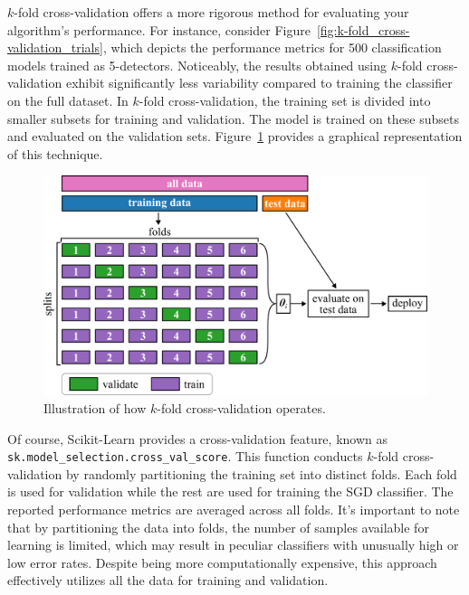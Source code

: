 \documentclass[12pt,letter]{article}
\begin{document}
$k$-fold cross-validation offers a more rigorous method for evaluating your algorithm's performance. For instance, consider Figure~\ref{fig:k-fold_cross-validation_trials}, which depicts the performance metrics for 500 classification models trained as 5-detectors. Noticeably, the results obtained using $k$-fold cross-validation exhibit significantly less variability compared to training the classifier on the full dataset. In $k$-fold cross-validation, the training set is divided into smaller subsets for training and validation. The model is trained on these subsets and evaluated on the validation sets. Figure~\ref{fig:grid_search_cross_validation} provides a graphical representation of this technique.

\begin{figure}[H]
    \centering
    \includegraphics[]{../figures/grid_search_cross_validation.png}
    \caption{Illustration of how $k$-fold cross-validation operates.}
    \label{fig:grid_search_cross_validation}
\end{figure}

Of course, Scikit-Learn provides a cross-validation feature, known as \texttt{sk.model\_selection.\allowbreak cross\_val\_score}. This function conducts $k$-fold cross-validation by randomly partitioning the training set into distinct folds. Each fold is used for validation while the rest are used for training the SGD classifier. The reported performance metrics are averaged across all folds. It's important to note that by partitioning the data into folds, the number of samples available for learning is limited, which may result in peculiar classifiers with unusually high or low error rates. Despite being more computationally expensive, this approach effectively utilizes all the data for training and validation.
\end{document}
